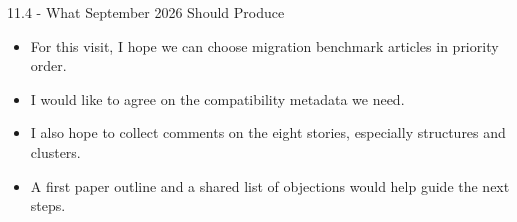 \documentclass[aspectratio=169,11pt]{beamer}
\begin{document}
\begin{frame}[fragile,t]{11.4 - What September 2026 Should Produce}
\begin{itemize}
\setlength{\itemsep}{1pt}
\setlength{\parsep}{0pt}
\setlength{\parskip}{0pt}
\item For this visit, I hope we can choose migration benchmark articles in priority order.
\item I would like to agree on the compatibility metadata we need.
\item I also hope to collect comments on the eight stories, especially structures and clusters.
\item A first paper outline and a shared list of objections would help guide the next steps.
\end{itemize}
\end{frame}
\end{document}
